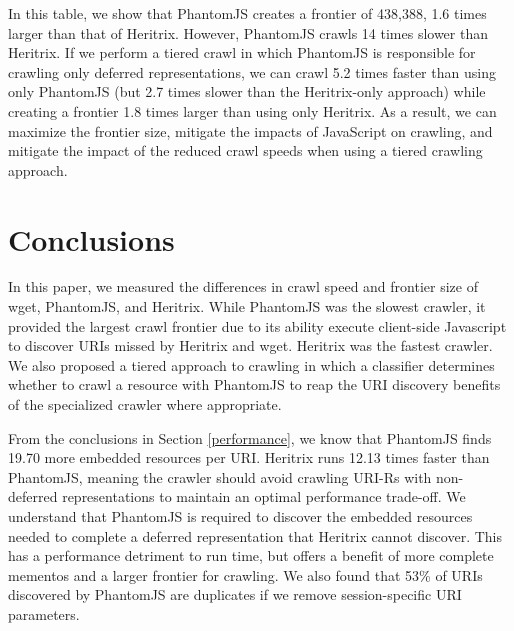 \documentclass{ipres_proc_article-sp}
\begin{document}

In this table, we show that PhantomJS creates a frontier of 438,388, 1.6 times larger than that of Heritrix. However, PhantomJS crawls 14 times slower than Heritrix. If we perform a tiered crawl in which PhantomJS is responsible for crawling only deferred representations, we can crawl 5.2 times faster than using only PhantomJS (but 2.7 times slower than the Heritrix-only approach) while creating a frontier 1.8 times larger than using only Heritrix. As a result, we can maximize the frontier size, mitigate the impacts of JavaScript on crawling, and mitigate the impact of the reduced crawl speeds when using a tiered crawling approach.

\section{Conclusions}
\label{conclusion}

In this paper, we measured the differences in crawl speed and frontier size of wget, PhantomJS, and Heritrix. While PhantomJS was the slowest crawler, it provided the largest crawl frontier due to its ability execute client-side Javascript to discover URIs missed by Heritrix and wget. Heritrix was the fastest crawler. We also proposed a tiered approach to crawling in which a classifier determines whether to crawl a resource with PhantomJS to reap the URI discovery benefits of the specialized crawler where appropriate.

From the conclusions in Section \ref{performance}, we know that PhantomJS finds 19.70 more embedded resources per URI. Heritrix runs 12.13 times faster than PhantomJS, meaning the crawler should avoid crawling URI-Rs with non-deferred representations to maintain an optimal performance trade-off. We understand that PhantomJS is required to discover the embedded resources needed to complete a deferred representation that Heritrix cannot discover. This has a performance detriment to run time, but offers a benefit of more complete mementos and a larger frontier for crawling. We also found that 53\% of URIs discovered by PhantomJS are duplicates if we remove session-specific URI parameters. 
\end{document}
